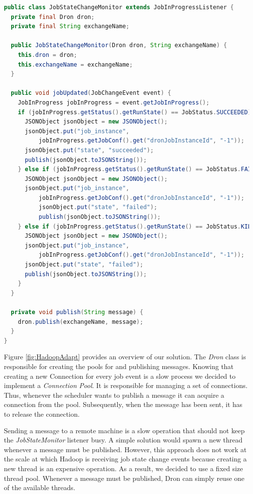\documentclass[11pt,a4paper,twoside]{report}
\begin{document}
\newpage
\begin{lstlisting}[language=Java,caption={Job State Listener},
label={lst:MRAdapt}]
public class JobStateChangeMonitor extends JobInProgressListener {
  private final Dron dron;
  private final String exchangeName;

  public JobStateChangeMonitor(Dron dron, String exchangeName) {
    this.dron = dron;
    this.exchangeName = exchangeName;
  }

  public void jobUpdated(JobChangeEvent event) {
    JobInProgress jobInProgress = event.getJobInProgress();
    if (jobInProgress.getStatus().getRunState() == JobStatus.SUCCEEDED) {
      JSONObject jsonObject = new JSONObject();
      jsonObject.put("job_instance",
          jobInProgress.getJobConf().get("dronJobInstanceId", "-1"));
      jsonObject.put("state", "succeeded");
      publish(jsonObject.toJSONString());
    } else if (jobInProgress.getStatus().getRunState() == JobStatus.FAILED) {
      JSONObject jsonObject = new JSONObject();
      jsonObject.put("job_instance",
          jobInProgress.getJobConf().get("dronJobInstanceId", "-1"));
          jsonObject.put("state", "failed");
          publish(jsonObject.toJSONString());			
    } else if (jobInProgress.getStatus().getRunState() == JobStatus.KILLED) {
      JSONObject jsonObject = new JSONObject();
      jsonObject.put("job_instance",
          jobInProgress.getJobConf().get("dronJobInstanceId", "-1"));
      jsonObject.put("state", "failed");
      publish(jsonObject.toJSONString());
    }
  }

  private void publish(String message) {
    dron.publish(exchangeName, message);
  }
}
\end{lstlisting}


Figure \ref{fig:HadoopAdapt} provides an overview of our solution. The \textit{Dron} class is responsible for creating the pools for and publishing messages. Knowing that creating a new Connection for every job event is a slow process we decided to implement a \textit{Connection Pool}. It is responsible for managing a set of connections. Thus, whenever the scheduler wants to publish a message it can acquire a connection from the pool. Subsequently, when the message has been sent, it has to release the connection.


Sending a message to a remote machine is a slow operation that should not keep the \textit{JobStateMonitor} listener busy. A simple solution would spawn a new thread whenever a message must be published. However, this approach does not work at the scale at which Hadoop is receiving job state change events because creating a new thread is an expensive operation. As a result, we decided to use a fixed size thread pool. Whenever a message must be published, Dron can simply reuse one of the available threads. 
\end{document}
